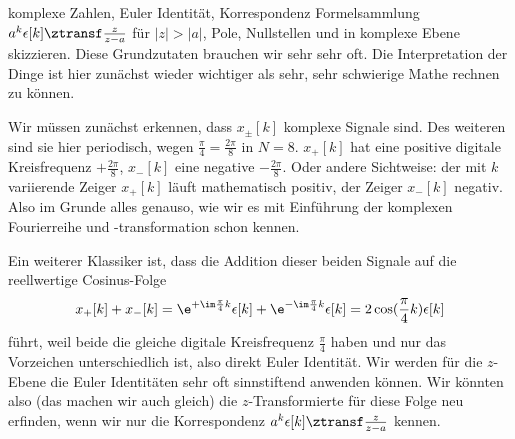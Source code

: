 \begin{Werkzeug}
komplexe Zahlen, Euler Identität,
Korrespondenz Formelsammlung $a^k \epsilon[k] \ztransf \frac{z}{z-a}$ für $|z|>|a|$,
Pole, Nullstellen und in komplexe Ebene skizzieren. Diese Grundzutaten brauchen wir
sehr sehr oft. Die Interpretation der Dinge ist hier zunächst wieder wichtiger
als sehr, sehr schwierige Mathe rechnen zu können.
\end{Werkzeug}
\begin{Ansatz}
Wir müssen zunächst erkennen, dass $x_\pm[k]$ komplexe Signale sind. Des weiteren
sind sie hier periodisch, wegen $\frac{\pi}{4}=\frac{2\pi}{8}$ in $N=8$.
$x_+[k]$ hat eine positive digitale Kreisfrequenz $+\frac{2\pi}{8}$, $x_-[k]$ eine negative $-\frac{2\pi}{8}$. Oder
andere Sichtweise: der mit $k$ variierende Zeiger $x_+[k]$ läuft mathematisch
positiv, der Zeiger $x_-[k]$ negativ. Also im Grunde alles genauso, wie wir
es mit Einführung der komplexen Fourierreihe und -transformation schon kennen.

Ein weiterer Klassiker ist, dass die Addition dieser beiden Signale auf
die reellwertige Cosinus-Folge
\begin{align}
x_+[k] + x_-[k]=
\e^{+\im\frac{\pi}{4} k} \epsilon[k] + \e^{-\im\frac{\pi}{4} k} \epsilon[k]
= 2 \cos(\frac{\pi}{4} k) \epsilon[k]
\end{align}
führt, weil beide die gleiche digitale Kreisfrequenz $\frac{\pi}{4}$ haben und
nur das Vorzeichen unterschiedlich ist, also direkt Euler Identität.
%
Wir werden für die $z$-Ebene die Euler Identitäten sehr oft sinnstiftend
anwenden können.
%
Wir könnten also (das machen wir auch gleich) die $z$-Transformierte für diese Folge neu
erfinden, wenn wir nur die Korrespondenz $a^k \epsilon[k] \ztransf \frac{z}{z-a}$
kennen.
\end{Ansatz}

